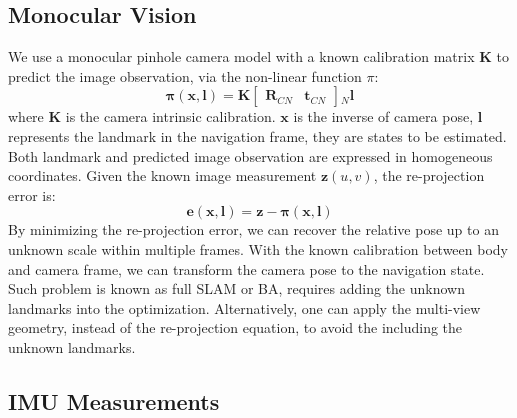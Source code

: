 \documentclass[journal,article,submit,moreauthors,pdftex]{Definitions/mdpi}
\begin{document}
\subsection{Monocular Vision}
We use a monocular pinhole camera model with a known calibration matrix $\boldsymbol{K}$ to predict the image observation, via the non-linear function $\pi$: 
\begin{equation}
    \boldsymbol{\pi}(\boldsymbol{x,l}) = \boldsymbol{K}
    \left[\begin{matrix} \boldsymbol{R}_{CN} & \boldsymbol{t}_{CN} \end{matrix}\right]{_N}\boldsymbol{l}
\end{equation}
where $\boldsymbol{K}$ is the camera intrinsic calibration. $\boldsymbol{x}$ is the inverse of camera pose, $\boldsymbol{l}$ represents the landmark in the navigation frame, they are states to be estimated. Both landmark and predicted image observation are expressed in homogeneous coordinates. Given the known image measurement $\boldsymbol{z}(u,v)$, the re-projection error is:
\begin{equation}
    \boldsymbol{e}(\boldsymbol{x,l}) = \boldsymbol{z} - \boldsymbol{\pi}(\boldsymbol{x,l})
\end{equation}
By minimizing the re-projection error, we can recover the relative pose up to an unknown scale within multiple frames. With the known calibration between body and camera frame, we can transform the camera pose to the navigation state. Such problem is known as full SLAM or BA, requires adding the unknown landmarks into the optimization. Alternatively, one can apply the multi-view geometry, instead of the re-projection equation, to avoid the including the unknown landmarks. 

\subsection{IMU Measurements}
\unskip
\end{document}

